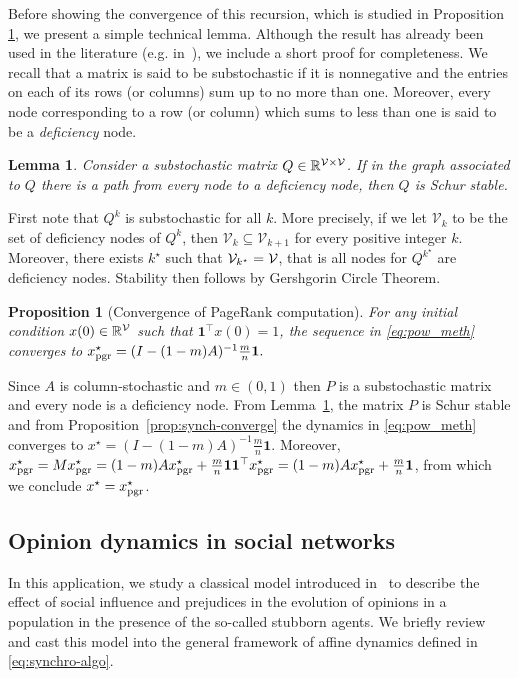 \documentclass{IEEEtran}
\newtheorem{lemma}{Lemma}
\newtheorem{proposition}{Proposition}
\newcommand{\subscr}[2]{#1_{\textup{#2}}}
\newcommand{\real}{\mathbb{R}}
\newcommand{\R}{\mathbb{R}} \newcommand{\N}{\mathbb{N}}  \newcommand{\Z}{\mathbb{Z}}
\newcommand{\pgr}{{\subscr{x}{pgr}^{\star}}} \newcommand{\loc}{{\subscr{x}{loc}^{\star}}} \newcommand{\op}{{\subscr{x}{opd}^{\star}}}
\newcommand{\1}{\mathbf{1}} \newcommand{\ind}{\mathds{1}}
\begin{document}
Before showing the convergence of this recursion, which is studied in Proposition \ref{prop:convPR}, we present a simple technical lemma. 
Although the result has already been used in the literature (e.g. in~\cite{DA-GC-FF-AO:11}), we include a short proof for completeness. 
We recall that a matrix is said to be substochastic if it is nonnegative and the entries on each of its rows (or columns) sum up to no more than one. Moreover, every node corresponding to a row (or column) which sums to less than one is said to be a {\em deficiency} node. 

\begin{lemma}\label{lemma:substoch_stab}
Consider a  substochastic matrix $Q\in \real^{\V\times \V}$. If in the graph associated to $Q$ there is a path from every node to a deficiency node, then $Q$ is Schur stable.
\end{lemma}

\begin{IEEEproof}
First note that  $Q^k$ is substochastic for all $k$.  More precisely,  if we let $\mathcal{V}_k$ to be the set of deficiency nodes of $Q^k$,  then $\mathcal{V}_k\subseteq \mathcal{V}_{k+1}$ for every positive integer $k$. Moreover, there exists $k^\star$ such that 
$\mathcal{V}_{k^\star}=\mathcal{V}$, that is all nodes for $Q^{k^\star}$ are deficiency nodes.
Stability then follows by Gershgorin Circle Theorem.
\end{IEEEproof}

\begin{proposition}[Convergence of PageRank computation]\label{prop:convPR}
For any initial condition $x(0)\in\R^{\V}$ such that $\1^{\top} x(0)=1$, the sequence in \eqref{eq:pow_meth} converges to
$\pgr=(I-(1-m)A)^{-1}\frac{m}{n}\1.$
\end{proposition}

\begin{IEEEproof}
Since $A$ is column-stochastic and $m\in(0,1)$ then $P$ is a substochastic matrix and every node is a deficiency node. From Lemma~\ref{lemma:substoch_stab}, the matrix $P$ is Schur stable and from Proposition~\ref{prop:synch-converge} the dynamics in \eqref{eq:pow_meth} converges to $x^\star={(I-(1-m)A)^{-1}}\frac{m}{n}\1$.
Moreover, $\pgr=M\pgr=(1-m)A\pgr+\frac{m}{n}\1\1^{\top}\pgr=(1-m)A\pgr+\frac{m}{n}\1$, from which we conclude $x^{\star}=\pgr$.
\end{IEEEproof}

\subsection{Opinion dynamics in social networks}
In this application, we study a classical model introduced in~\cite{NEF-ECJ:99} to describe the effect of social influence and prejudices in the evolution of opinions in a population in the presence of the so-called stubborn agents. We briefly review and cast this model into the general framework of affine dynamics defined in \eqref{eq:synchro-algo}.
\end{document}
